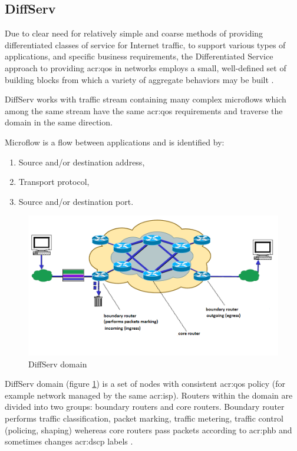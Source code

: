 \documentclass[11pt,openany]{book}
\begin{document}
      \subsection{DiffServ}

        Due to clear need for relatively simple and coarse methods of providing differentiated classes of service for
        Internet traffic, to support various types of applications, and specific business requirements, the
        Differentiated Service approach to providing \gls{acr:qos} in networks employs a small, well-defined set of
        building blocks from which a variety of aggregate behaviors may be built \cite{qos}.

        DiffServ works with traffic stream containing many complex microflows which among the same stream have the same
        \gls{acr:qos} requirements and traverse the domain in the same direction.

        Microflow is a flow between applications and is identified by:

        \begin{enumerate}
          \item Source and/or destination address,
          \item Transport protocol,
          \item Source and/or destination port.
        \end{enumerate}

        \begin{figure}[h]
          \centering
          \includegraphics[width=.7\textwidth]{img/qos/diffserv.png}

          \caption{DiffServ domain \cite{qos2}}
          \label{fig:bg:diff}
        \end{figure}

        DiffServ domain (figure \ref{fig:bg:diff}) is a set of nodes with consistent \gls{acr:qos} policy (for example
        network managed by the same \gls{acr:isp}). Routers within the domain are divided into two groups: boundary
        routers and core routers. Boundary router performs traffic classification, packet marking, traffic metering,
        traffic control (policing, shaping) wehereas core routers pass packets according to \gls{acr:phb} and sometimes
        changes \gls{acr:dscp} labels \cite{qos2}.
\end{document}
